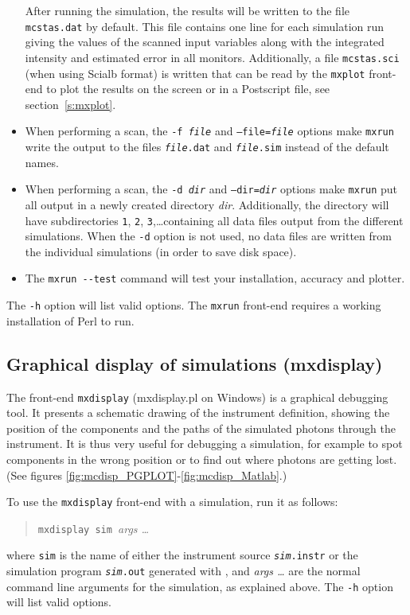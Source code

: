 \begin{itemize}
After running the simulation, the results will be written to the file
\verb+mcstas.dat+ by default. This file contains one line for each
simulation run giving the values of the scanned input variables along
with the integrated intensity and estimated error in all monitors. Additionally, a
file \verb+mcstas.sci+ (when using Scialb format) is written that can be read by the \verb+mxplot+
front-end to plot the results on the screen or in a Postscript file, see
section~\ref{s:mxplot}. 
\item When performing a scan, the \texttt{-f \textit{file}} and
  \texttt{--file=\textit{file}} options make \verb+mxrun+ write the output
  to the files \texttt{\textit{file\/}.dat} and \texttt{\textit{file\/}.sim}
  instead of the default names.
\item When performing a scan, the \texttt{-d \textit{dir}} and
  \texttt{--dir=\textit{dir}} options make \verb+mxrun+ put all output in a
  newly created directory \textit{dir}. Additionally, the directory will
  have subdirectories \verb+1+, \verb+2+, \verb+3+,\ldots containing all
  data files output from the different simulations. When the \verb+-d+
  option is not used, no data files are written from the individual
  simulations (in order to save disk space).
\item The \verb+mxrun --test+ command will test your \MCX installation, accuracy and plotter. 
\end{itemize}

The \verb+-h+ option will list valid options. The \verb+mxrun+ front-end requires a working installation of Perl to run.


\subsection{Graphical display of simulations (mxdisplay)}
\label{s:mxdisplay}

The front-end \verb+mxdisplay+ (mxdisplay.pl on Windows) is a graphical debugging tool.
It presents a schematic drawing of the instrument
definition, showing the position of the components and the paths of the
simulated photons through the instrument. It is thus very useful for
debugging a simulation, for example to spot components in the wrong
position or to find out where photons are getting lost.
(See figures \ref{fig:mcdisp_PGPLOT}-\ref{fig:mcdisp_Matlab}.)

To use the \verb+mxdisplay+ front-end with a simulation, run it as
follows:
\begin{quote}
  \verb+mxdisplay sim +\textit{args \ldots}
\end{quote}
where \verb+sim+ is the name of either the instrument source \texttt{\textit{sim}.instr} or the simulation program \texttt{\textit{sim}.out} generated with
\MCX, and \textit{args \ldots} are the normal command line arguments for
the simulation, as explained above. The \verb+-h+ option will list valid options.

